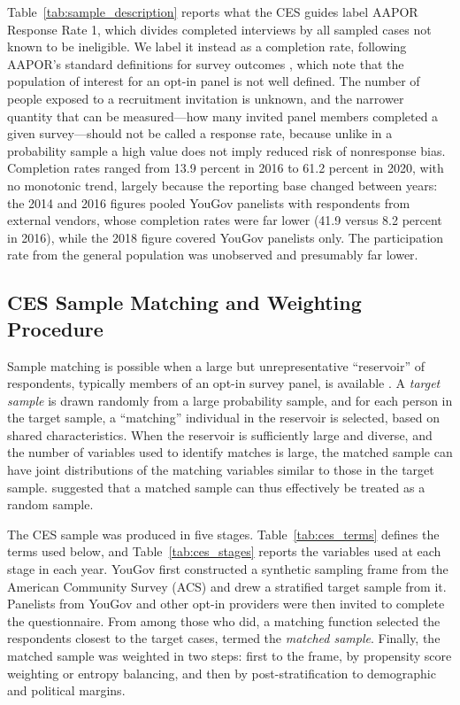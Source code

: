\documentclass[12pt]{article}
\begin{document}
Table~\ref{tab:sample_description} reports what the CES guides label AAPOR Response Rate 1, which divides completed interviews by all sampled cases not known to be ineligible. We label it instead as a completion rate, following AAPOR's standard definitions for survey outcomes \parencite[78]{aapor2023}, which note that the population of interest for an opt-in panel is not well defined. The number of people exposed to a recruitment invitation is unknown, and the narrower quantity that can be measured---how many invited panel members completed a given survey---should not be called a response rate, because unlike in a probability sample a high value does not imply reduced risk of nonresponse bias. Completion rates ranged from 13.9 percent in 2016 to 61.2 percent in 2020, with no monotonic trend, largely because the reporting base changed between years: the 2014 and 2016 figures pooled YouGov panelists with respondents from external vendors, whose completion rates were far lower (41.9 versus 8.2 percent in 2016), while the 2018 figure covered YouGov panelists only. The participation rate from the general population was unobserved and presumably far lower.




\subsection*{CES Sample Matching and Weighting Procedure}
Sample matching is possible when a large but unrepresentative ``reservoir'' of respondents, typically members of an opt-in survey panel, is available \parencite{cochran_sampling_1977}. A \textit{target sample} is drawn randomly from a large probability sample, and for each person in the target sample, a ``matching'' individual in the reservoir is selected, based on shared characteristics. When the reservoir is sufficiently large and diverse, and the number of variables used to identify matches is large, the matched sample can have joint distributions of the matching variables similar to those in the target sample. \textcite{rivers_sample_2006} suggested that a matched sample can thus effectively be treated as a random sample.

The CES sample was produced in five stages. Table~\ref{tab:ces_terms} defines the terms used below, and Table~\ref{tab:ces_stages} reports the variables used at each stage in each year. YouGov first constructed a synthetic sampling frame from the American Community Survey (ACS) and drew a stratified target sample from it. Panelists from YouGov and other opt-in providers were then invited to complete the questionnaire. From among those who did, a matching function selected the respondents closest to the target cases, termed the \textit{matched sample}. Finally, the matched sample was weighted in two steps: first to the frame, by propensity score weighting or entropy balancing, and then by post-stratification to demographic and political margins. 
\end{document}

